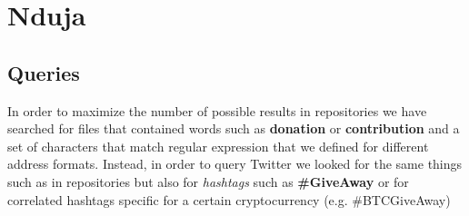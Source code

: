 \section{Nduja}
\subsection{Queries} 
\label{sec:queries}
In order to maximize the number of possible results in repositories we have
searched for files that contained words such as \textbf{donation} or
\textbf{contribution} and a set of characters that match regular expression
that we defined for different address formats. Instead, in order to query
Twitter we looked for the same things such as in repositories but also for
\textit{hashtags} such as \textbf{\#GiveAway} or for correlated hashtags
specific for a certain cryptocurrency (e.g. \#BTCGiveAway)

